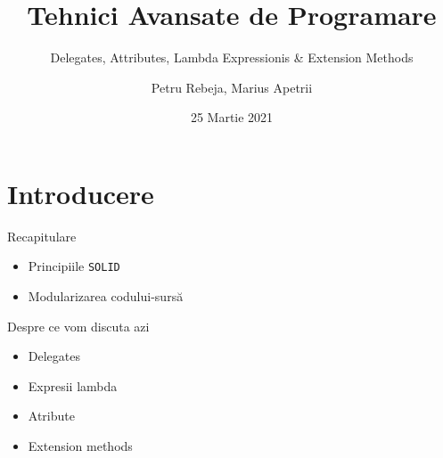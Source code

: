 \documentclass[presentation]{beamer}
\author{Petru Rebeja, Marius Apetrii}
\date{25 Martie 2021}
\title{Tehnici Avansate de Programare}
\subtitle{Delegates,  Attributes, Lambda Expressionis \& Extension Methods}
\institute[UAIC]{Facultatea de Matematică\\Universitatea Alexandru Ioan Cuza, Iași}
\begin{document}
\maketitle
\section{Introducere}
\label{sec:org8ecc907}
\begin{frame}[label={sec:org4686992},fragile]{Recapitulare}
 \begin{itemize}
\item Principiile \texttt{SOLID}
\item Modularizarea codului-sursă
\end{itemize}
\end{frame}
\begin{frame}[label={sec:org5a7adb7}]{Despre ce vom discuta azi}
\begin{itemize}
\item Delegates
\item Expresii lambda
\item Atribute
\item Extension methods
\end{itemize}
\end{frame}
\end{document}
